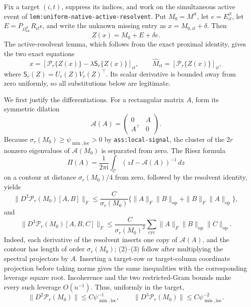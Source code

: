 Fix a target \((i,t)\), suppress its indices, and work on the simultaneous active event of \texttt{lem:uniform-native-active-resolvent}.  Put \(M_0=M^{it}\), let \(e=E^{it}_{it}\), let \(E=P_{\Omega_{\mathrm{loc}}^{it}}R_{it}\epsilon\), and write the unknown missing entry as \(x=M_{0,it}+\delta\).  Then
\[
 Z(x)=M_0+E+\delta e.
\]
The active-resolvent lemma, which follows from the exact proximal identity, gives the two exact equations
\[
 x=[\mathcal P_r\{Z(x)\}-\lambda\mathsf S_r\{Z(x)\}]_{it},
 \qquad
 \widehat M_{it}=[\mathcal P_r\{Z(x)\}]_{it},
 \tag{1}
\]
where \(\mathsf S_r(Z)=U_r(Z)V_r(Z)^{\top}\).  Its scalar derivative is bounded away from zero uniformly, so all substitutions below are legitimate.

We first justify the differentiations.  For a rectangular matrix \(A\), form its symmetric dilation
\[
 \mathscr A(A)=\begin{pmatrix}0&A\\A^{\top}&0\end{pmatrix}.
\]
Because \(\sigma_r(M_0)\ge\psi_{\min,\mathrm{loc}}>0\) by \texttt{ass:local-signal}, the cluster of the \(2r\) nonzero eigenvalues of \(\mathscr A(M_0)\) is separated from zero.  The Riesz formula
\[
 \Pi(A)=\frac{1}{2\pi\mathrm i}\int_{\mathcal C}
 (zI-\mathscr A(A))^{-1}\,dz
\]
on a contour at distance \(\sigma_r(M_0)/4\) from zero, followed by the resolvent identity, yields
\[
 \|D^2\mathcal P_r(M_0)[A,B]\|_F
 \le \frac{C}{\sigma_r(M_0)}
 \{\|A\|_F\|B\|_{\mathrm{op}}+\|B\|_F\|A\|_{\mathrm{op}}\},
 \tag{2}
\]
and
\[
 \|D^3\mathcal P_r(M_0)[A,B,C]\|_F
 \le \frac{C}{\sigma_r(M_0)^2}
 \sum_{\mathrm{cyc}}\|A\|_F\|B\|_{\mathrm{op}}\|C\|_{\mathrm{op}}.
 \tag{3}
\]
Indeed, each derivative of the resolvent inserts one copy of \(\mathscr A(A)\), and the contour has length of order \(\sigma_r(M_0)\); (2)--(3) follow after multiplying the spectral projectors by \(A\).  Inserting a target-row or target-column coordinate projection before taking norms gives the same inequalities with the corresponding leverage square root.  Incoherence and the two restricted-Gram bounds make every such leverage \(O(n^{-1})\).  Thus, uniformly in the target,
\[
 \|D^2\mathcal P_r(M_0)\|\le C\psi_{\min,\mathrm{loc}}^{-1},
 \qquad
 \|D^3\mathcal P_r(M_0)\|\le C\psi_{\min,\mathrm{loc}}^{-2}.
 \tag{4}
\]

